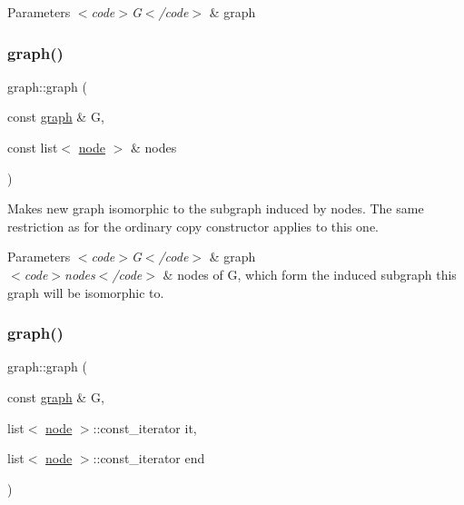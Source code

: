 \begin{DoxyParams}{Parameters}
{\em $<$code$>$\+G$<$/code$>$} & graph \\
\hline
\end{DoxyParams}
\mbox{\label{classgraph_a739d58ba54344d5107e7841e34d01243}} 
\subsubsection{\texorpdfstring{graph()}{graph()}\hspace{0.1cm}{\footnotesize\ttfamily [3/4]}}
{\footnotesize\ttfamily graph\+::graph (\begin{DoxyParamCaption}\item[{const \mbox{\hyperlink{classgraph}{graph}} \&}]{G,  }\item[{const list$<$ \mbox{\hyperlink{classnode}{node}} $>$ \&}]{nodes }\end{DoxyParamCaption})}

Makes new graph isomorphic to the subgraph induced by {\ttfamily nodes}. The same restriction as for the ordinary copy constructor applies to this one.


\begin{DoxyParams}{Parameters}
{\em $<$code$>$\+G$<$/code$>$} & graph \\
\hline
{\em $<$code$>$nodes$<$/code$>$} & nodes of {\ttfamily G}, which form the induced subgraph this graph will be isomorphic to. \\
\hline
\end{DoxyParams}
\mbox{\label{classgraph_aa10c09b6e5c7f6f98432d1c454aefe89}} 
\subsubsection{\texorpdfstring{graph()}{graph()}\hspace{0.1cm}{\footnotesize\ttfamily [4/4]}}
{\footnotesize\ttfamily graph\+::graph (\begin{DoxyParamCaption}\item[{const \mbox{\hyperlink{classgraph}{graph}} \&}]{G,  }\item[{list$<$ \mbox{\hyperlink{classnode}{node}} $>$\+::const\+\_\+iterator}]{it,  }\item[{list$<$ \mbox{\hyperlink{classnode}{node}} $>$\+::const\+\_\+iterator}]{end }\end{DoxyParamCaption})}

